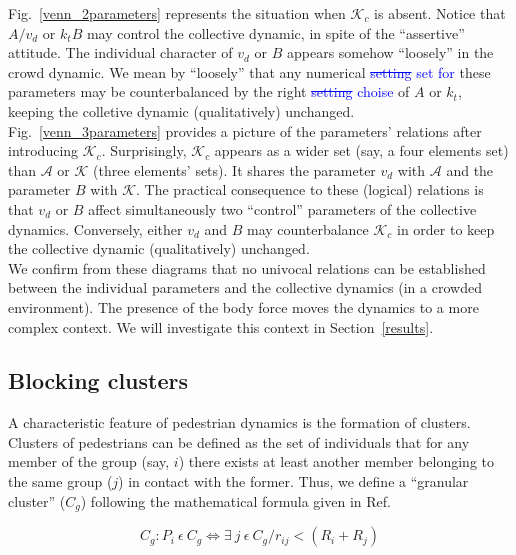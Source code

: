 \documentclass[preprint,12pt]{elsarticle}
\begin{document}
Fig.~\ref{venn_2parameters} represents the situation when $\mathcal{K}_c$ is 
absent. Notice that $A/v_d$ or $k_t B$ may control the collective 
dynamic, in spite of the ``assertive'' attitude. The individual character of 
$v_d$ or $B$ appears somehow ``loosely'' in the crowd dynamic. We mean by 
``loosely'' that any numerical \textcolor{blue}{\sout{setting} set for} these parameters may be 
counterbalanced by the right \textcolor{blue}{\sout{setting} choise } of $A$ or $k_t$, keeping the 
colletive dynamic (qualitatively) unchanged.  \\

Fig.~\ref{venn_3parameters} provides a picture of the parameters' relations 
after introducing $\mathcal{K}_c$. Surprisingly, $\mathcal{K}_c$ appears as a
wider set (say, a four elements set) than $\mathcal{A}$ or $\mathcal{K}$ (three 
elements' sets). It shares the parameter $v_d$ with $\mathcal{A}$ and the 
parameter $B$ with $\mathcal{K}$. The practical consequence to these (logical)
relations is that $v_d$ or $B$ affect simultaneously two ``control'' parameters 
of the collective dynamics. Conversely, either $v_d$ and $B$ may counterbalance 
$\mathcal{K}_c$ in order to keep the collective dynamic (qualitatively) 
unchanged.  \\

We confirm from these diagrams that no univocal relations can be established 
between the individual parameters and the collective dynamics (in a crowded 
environment). The presence of the body force moves the dynamics to a more 
complex context. We will investigate this context in Section~\ref{results}. \\


\subsection{\label{blocking_clusters} Blocking clusters}

A characteristic feature of pedestrian dynamics is the formation of clusters. Clusters of pedestrians can 
be defined as the set of individuals that for any member of the group (say, $i$) there exists at least
another member belonging to the same group ($j$) in contact with the former. 
Thus, we define a ``granular cluster'' ($C_g$) following the mathematical formula given in Ref.~\cite{strachan1997fragment}

\begin{equation}
C_g:P_i~\epsilon~ C_g \Leftrightarrow \exists~ j~\epsilon~C_g / r_{ij} < (R_i+R_j) \label{ec-cluster}
\end{equation}
\end{document}

